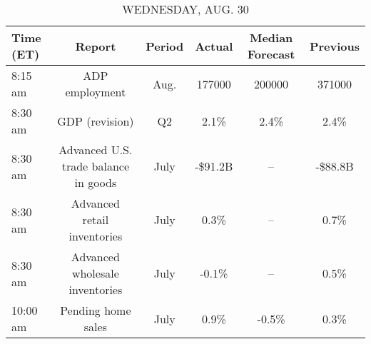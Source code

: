 \documentclass{article}%
\begin{document}
\begin{table}[htbp]%
\caption{WEDNESDAY, AUG. 30}%
\centering%
\begin{adjustbox}{width=1\textwidth}%
\begin{tabular}{lccccc}
\toprule
Time (ET) &                               Report & Period &  Actual & Median Forecast & Previous \\
\midrule
  8:15 am &                       ADP employment &   Aug. &  177000 &          200000 &   371000 \\
  8:30 am &                       GDP (revision) &     Q2 &    2.1\% &            2.4\% &     2.4\% \\
  8:30 am & Advanced U.S. trade balance in goods &   July & -\$91.2B &              -- &  -\$88.8B \\
  8:30 am &          Advanced retail inventories &   July &    0.3\% &              -- &     0.7\% \\
  8:30 am &       Advanced wholesale inventories &   July &   -0.1\% &              -- &     0.5\% \\
 10:00 am &                   Pending home sales &   July &    0.9\% &           -0.5\% &     0.3\% \\
\bottomrule
\end{tabular}
%
\end{adjustbox}%
\end{table}

%
\end{document}

